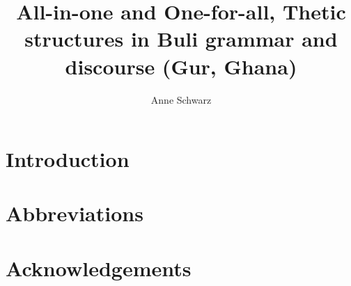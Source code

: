\documentclass[output=paper]{langsci/langscibook}
\title{All-in-one and One-for-all, Thetic structures in Buli grammar and discourse (Gur, Ghana)}
\author{%
 Anne Schwarz \affiliation{}
}
\begin{document}
\section{Introduction} 

\section*{Abbreviations}
\section*{Acknowledgements}

\printbibliography[heading=subbibliography,notkeyword=this]
\end{document}
